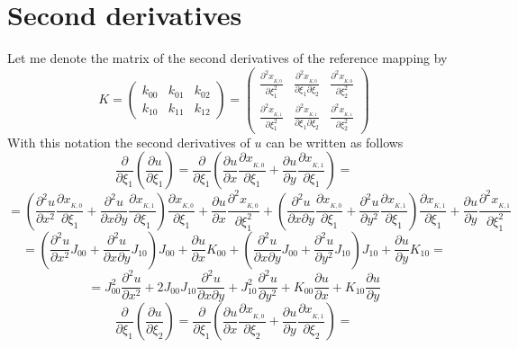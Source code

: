 \documentclass[a4paper,12pt]{article}
\begin{document}
\section{Second derivatives}
Let me denote the matrix of the second derivatives of the reference mapping by
$$K =
\left(\begin{array}{ccc}
k_{00} & k_{01} & k_{02}\\[3mm]
k_{10} & k_{11} & k_{12}
\end{array}\right) =
\left(\begin{array}{ccc}
\frac{\partial^2 x_{_{K,0}}}{\partial \xi_1^2} & \frac{\partial^2 x_{_{K,0}}}{\partial \xi_1 \partial \xi_2} & \frac{\partial^2 x_{_{K,0}}}{\partial \xi_2^2}  \\[3mm]
\frac{\partial^2 x_{_{K,1}}}{\partial \xi_1^2} & \frac{\partial^2 x_{_{K,1}}}{\partial \xi_1 \partial \xi_2}& \frac{\partial^2 x_{_{K,1}}}{\partial \xi_2^2}
\end{array}\right)
$$
With this notation the second derivatives of $u$ can be written as follows
$$\frac{\partial}{\partial \xi_1}\left(\frac{\partial u}{\partial \xi_1} \right) = \frac{\partial}{\partial \xi_1}\left( \frac{\partial u}{\partial x} \frac{\partial x_{_{K,0}}}{\partial \xi_1} + \frac{\partial u}{\partial y} \frac{\partial x_{_{K,1}}}{\partial \xi_1} \right) =$$
$$= \left(\frac{\partial^2 u}{\partial x^2} \frac{\partial x_{_{K,0}}}{\partial \xi_1} + \frac{\partial^2 u}{\partial x \partial y} \frac{\partial x_{_{K,1}}}{\partial \xi_1} \right) \frac{\partial x_{_{K,0}}}{\partial \xi_1} + \frac{\partial u}{\partial x} \frac{\partial^2 x_{_{K,0}}}{\partial \xi_1^2} +  \left(\frac{\partial^2 u}{\partial x \partial y} \frac{\partial x_{_{K,0}}}{\partial \xi_1} + \frac{\partial^2 u}{\partial y^2} \frac{\partial x_{_{K,1}}}{\partial \xi_1} \right) \frac{\partial x_{_{K,1}}}{\partial \xi_1} + \frac{\partial u}{\partial y} \frac{\partial^2 x_{_{K,1}}}{\partial \xi_1^2}$$
$$= \left(\frac{\partial^2 u}{\partial x^2} J_{00} + \frac{\partial^2 u}{\partial x \partial y} J_{10} \right) J_{00} + \frac{\partial u}{\partial x} K_{00}  + \left(\frac{\partial^2 u}{\partial x \partial y} J_{00} + \frac{\partial^2 u}{\partial y^2} J_{10} \right) J_{10} + \frac{\partial u}{\partial y} K_{10} = $$
$$ = J_{00}^2 \frac{\partial^2 u}{\partial x^2} +  2 J_{00} J_{10}\frac{\partial^2 u}{\partial x \partial y} + J_{10}^2 \frac{\partial^2 u}{\partial y^2} +  K_{00} \frac{\partial u}{\partial x} +  K_{10} \frac{\partial u}{\partial y}
$$
\vspace*{5mm}
$$\frac{\partial}{\partial \xi_1}\left(\frac{\partial u}{\partial \xi_2} \right) = \frac{\partial}{\partial \xi_1}\left( \frac{\partial u}{\partial x} \frac{\partial x_{_{K,0}}}{\partial \xi_2} + \frac{\partial u}{\partial y} \frac{\partial x_{_{K,1}}}{\partial \xi_2} \right) =$$
\end{document}
